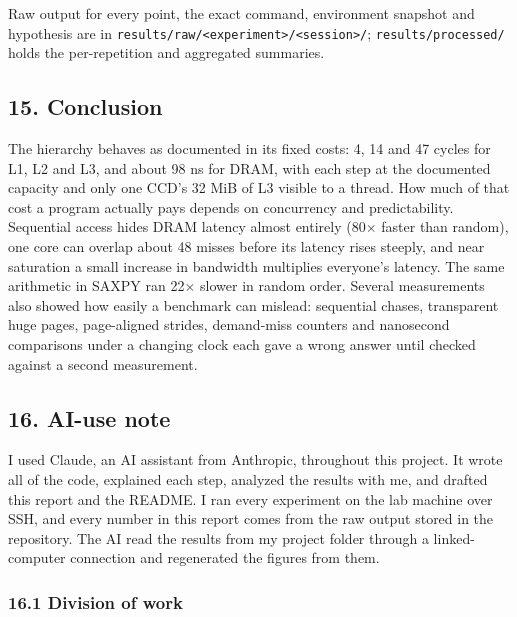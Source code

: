 \documentclass[10pt,letterpaper]{article}
\begin{document}
Raw output for every point, the exact command, environment
snapshot and hypothesis are in
\texttt{results/raw/\textless{}experiment\textgreater{}/\textless{}session\textgreater{}/};
\texttt{results/processed/} holds the per-repetition and
aggregated summaries.

\hypertarget{conclusion}{%
\subsection{15. Conclusion}\label{conclusion}}

The hierarchy behaves as documented in its fixed costs: 4,
14 and 47 cycles for L1, L2 and L3, and about 98 ns for
DRAM, with each step at the documented capacity and only one
CCD's 32 MiB of L3 visible to a thread. How much of that
cost a program actually pays depends on concurrency and
predictability. Sequential access hides DRAM latency almost
entirely (80$\times$ faster than random), one core can overlap
about 48 misses before its latency rises steeply, and near
saturation a small increase in bandwidth multiplies
everyone's latency. The same arithmetic in SAXPY ran 22$\times$
slower in random order. Several measurements also showed how
easily a benchmark can mislead: sequential chases,
transparent huge pages, page-aligned strides, demand-miss
counters and nanosecond comparisons under a changing clock
each gave a wrong answer until checked against a second
measurement.

\hypertarget{ai-use-note}{%
\subsection{16. AI-use note}\label{ai-use-note}}

I used Claude, an AI assistant from Anthropic, throughout
this project. It wrote all of the code, explained each step,
analyzed the results with me, and drafted this report and
the README. I ran every experiment on the lab machine over
SSH, and every number in this report comes from the raw
output stored in the repository. The AI read the results
from my project folder through a linked-computer connection
and regenerated the figures from them.

\hypertarget{division-of-work}{%
\subsubsection{16.1 Division of
work}\label{division-of-work}}
\end{document}

